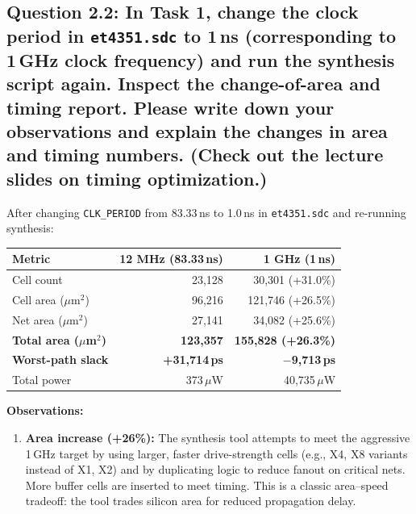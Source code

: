 \documentclass{article}
\begin{document}
\subsection*{Question 2.2: In Task 1, change the clock period in \texttt{et4351.sdc} to 1\,ns (corresponding to 1\,GHz clock frequency) and run the synthesis script again. Inspect the change-of-area and timing report. Please write down your observations and explain the changes in area and timing numbers. (Check out the lecture slides on timing optimization.)}

\begin{tcolorbox}[colback=white, colframe=black, width=\textwidth, title=Answer 2.2]

After changing \texttt{CLK\_PERIOD} from 83.33\,ns to 1.0\,ns in \texttt{et4351.sdc} and re-running synthesis:

\vspace{0.2cm}

\begin{tabular}{@{}lrr@{}}
\toprule
\textbf{Metric} & \textbf{12 MHz (83.33\,ns)} & \textbf{1 GHz (1\,ns)} \\
\midrule
Cell count & 23{,}128 & 30{,}301 (+31.0\%) \\
Cell area ($\mu$m$^2$) & 96{,}216 & 121{,}746 (+26.5\%) \\
Net area ($\mu$m$^2$) & 27{,}141 & 34{,}082 (+25.6\%) \\
\textbf{Total area ($\mu$m$^2$)} & \textbf{123{,}357} & \textbf{155{,}828 (+26.3\%)} \\
\midrule
\textbf{Worst-path slack} & \textbf{+31{,}714\,ps} & \textbf{$-$9{,}713\,ps} \\
Total power & 373\,$\mu$W & 40{,}735\,$\mu$W \\
\bottomrule
\end{tabular}

\vspace{0.3cm}

\textbf{Observations:}

\begin{enumerate}
\item \textbf{Area increase (+26\%):} The synthesis tool attempts to meet the aggressive 1\,GHz target by using larger, faster drive-strength cells (e.g., X4, X8 variants instead of X1, X2) and by duplicating logic to reduce fanout on critical nets. More buffer cells are inserted to meet timing. This is a classic area--speed tradeoff: the tool trades silicon area for reduced propagation delay.


\end{enumerate}
\end{tcolorbox}
\end{document}

